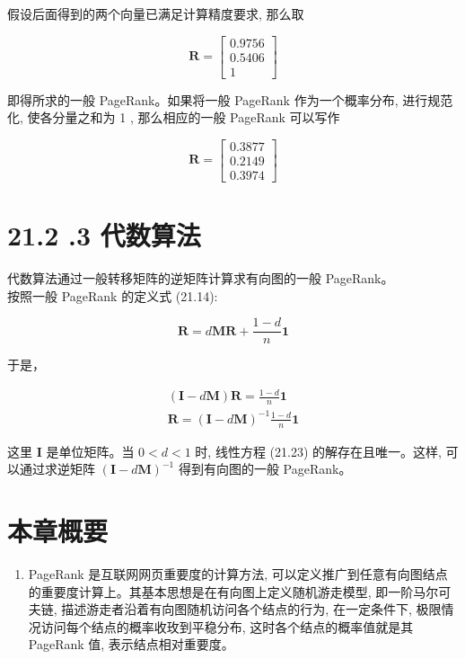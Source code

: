 \documentclass[10pt]{article}
\begin{document}
\begin{CJK*}{UTF8}{bsmi}
假设后面得到的两个向量已满足计算精度要求, 那么取

$$
\boldsymbol{R}=\left[\begin{array}{l}
0.9756 \\
0.5406 \\
1
\end{array}\right]
$$

即得所求的一般 PageRank。如果将一般 PageRank 作为一个概率分布, 进行规范化, 使各分量之和为 1 , 那么相应的一般 PageRank 可以写作

$$
\boldsymbol{R}=\left[\begin{array}{l}
0.3877 \\
0.2149 \\
0.3974
\end{array}\right]
$$

\section*{21.2 .3 代数算法}
代数算法通过一般转移矩阵的逆矩阵计算求有向图的一般 PageRank。\\
按照一般 PageRank 的定义式 (21.14):

$$
\boldsymbol{R}=d \boldsymbol{M} \boldsymbol{R}+\frac{1-d}{n} \boldsymbol{1}
$$

于是，


\begin{gather*}
(\boldsymbol{I}-d \boldsymbol{M}) \boldsymbol{R}=\frac{1-d}{n} \boldsymbol{1}  \tag{21.23}\\
\boldsymbol{R}=(\boldsymbol{I}-d \boldsymbol{M})^{-1} \frac{1-d}{n} \boldsymbol{1} \tag{21.24}
\end{gather*}


这里 $\boldsymbol{I}$ 是单位矩阵。当 $0<d<1$ 时, 线性方程 (21.23) 的解存在且唯一。这样, 可以通过求逆矩阵 $(\boldsymbol{I}-d \boldsymbol{M})^{-1}$ 得到有向图的一般 PageRank。

\section*{本章概要}
\begin{enumerate}
  \item PageRank 是互联网网页重要度的计算方法, 可以定义推广到任意有向图结点的重要度计算上。其基本思想是在有向图上定义随机游走模型, 即一阶马尔可夫链, 描述游走者沿着有向图随机访问各个结点的行为, 在一定条件下, 极限情况访问每个结点的概率收玫到平稳分布, 这时各个结点的概率值就是其 PageRank 值, 表示结点相对重要度。


\end{enumerate}
\end{CJK*}
\end{document}
